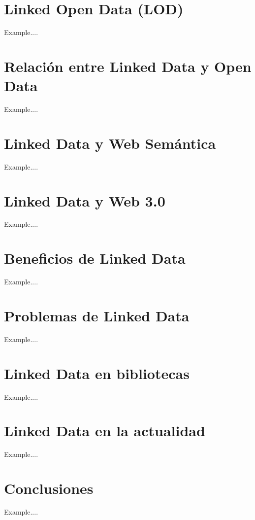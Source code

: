 \documentclass[11pt]{report}
\begin{document}
	\chapter{Linked Open Data (LOD)}
	Example....

	\chapter{Relación entre Linked Data y Open Data}
	Example....

	\chapter{Linked Data y Web Semántica}
	Example....

	\chapter{Linked Data y Web 3.0}
	Example....

	\chapter{Beneficios de Linked Data}
	Example....

	\chapter{Problemas de Linked Data}
	Example....

	\chapter{Linked Data en bibliotecas}
	Example....

	\chapter{Linked Data en la actualidad}
	Example....

	\chapter{Conclusiones}
	Example....
\end{document}
